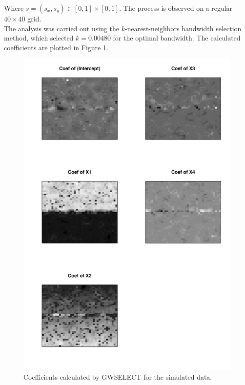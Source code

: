 \documentclass[authoryear ,review]{elsarticle}
\begin{document}
			Where $s=(s_x, s_y) \in [0,1] \times [0,1]$. The process is observed on a regular $40 \times 40$ grid.\\
			
			The analysis was carried out using the $k$-nearest-neighbors bandwidth selection method, which selected $k=0.00480$ for the optimal bandwidth. The calculated coefficients are plotted in Figure \ref{simulation-coefs}.\\
			
			
			\begin{figure}
				\begin{center}
					\includegraphics{../figures/simulation/coefs}
					\caption{Coefficients calculated by GWSELECT for the simulated data.\label{simulation-coefs}}
				\end{center}
			\end{figure}
			
		


\end{document}
